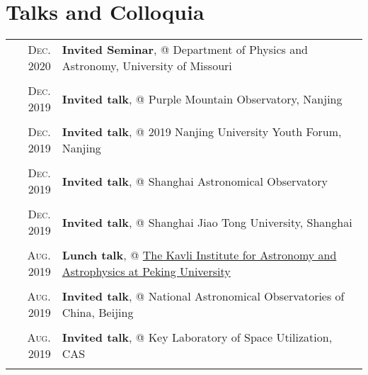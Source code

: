\documentclass[letterpaper,12pt]{article}
\newcommand{\textwrap}{5.3in}       %
\begin{document}
\section{Talks and Colloquia}

\begingroup
\renewcommand\arraystretch{0.3}
\vspace*{-.5em}
\begin{longtable}{r|p{\textwrap}}

    \textsc{Dec. 2020}   &   \textbf{Invited Seminar}, @ Department of Physics and Astronomy, University of Missouri \\
    \multicolumn{2}{c}{} \\

    \textsc{Dec. 2019}   &   \textbf{Invited talk}, @ Purple Mountain Observatory, Nanjing \\
    \multicolumn{2}{c}{} \\

    \textsc{Dec. 2019}   &   \textbf{Invited talk}, @ 2019 Nanjing University Youth Forum, Nanjing \\
    \multicolumn{2}{c}{} \\

    \textsc{Dec. 2019}   &   \textbf{Invited talk}, @ Shanghai Astronomical Observatory \\
    \multicolumn{2}{c}{} \\

    \textsc{Dec. 2019}   &   \textbf{Invited talk}, @ Shanghai Jiao Tong University, Shanghai \\
    \multicolumn{2}{c}{} \\

    \textsc{Aug. 2019}   &   \textbf{Lunch talk}, @ \href{http://kiaa.pku.edu.cn/info/1025/5076.htm}{The Kavli Institute for 
    Astronomy and Astrophysics at Peking University} \\
    \multicolumn{2}{c}{} \\

    \textsc{Aug. 2019}   &   \textbf{Invited talk}, @ National Astronomical Observatories of China, Beijing \\
    \multicolumn{2}{c}{} \\

    \textsc{Aug. 2019}   &   \textbf{Invited talk}, @ Key Laboratory of Space Utilization, CAS \\
    \multicolumn{2}{c}{} \\


\end{longtable}
\end{document}
